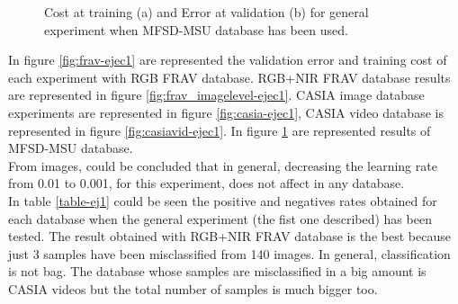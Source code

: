 \begin{figure}[htb]
\centering
{}
\caption{Cost at training (a) and Error at validation (b) for general experiment when MFSD-MSU database has been used.}
 \label{fig:mfsd-ejec1}
\end{figure}


In figure \ref{fig:frav-ejec1} are represented the validation error and training cost of each experiment with RGB FRAV database. RGB+NIR FRAV database results are represented in figure \ref{fig:frav_imagelevel-ejec1}. CASIA image database experiments are represented in figure  \ref{fig:casia-ejec1}, CASIA video database is represented in figure \ref{fig:casiavid-ejec1}. In figure \ref{fig:mfsd-ejec1} are represented results of MFSD-MSU database.\\

From images, could be concluded that in general, decreasing the learning rate from 0.01 to 0.001, for this experiment, does not affect in any database.\\

In table \ref{table-ej1} could be seen the positive and negatives rates obtained for each database when the general experiment (the fist one described) has been tested. The result obtained with RGB+NIR FRAV database is the best because just 3 samples have been misclassified from 140 images. In general, classification is not bag. The database whose samples are misclassified in a big amount is CASIA videos but the total number of samples is much bigger too.\\

